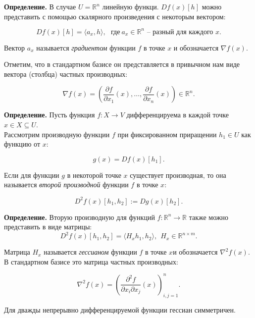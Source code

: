 \textbf{Определение.} В случае $U = \mathbb{R}^n$ линейную функци. $Df(x)[h]$ можно представить с помощью скалярного произведения с некоторым вектором:

$$Df(x)[h] = \langle a_x, h\rangle,\ \ \ \text{где}\ a_x\in\mathbb{R}^n\text{ -- разный для каждого } x. $$

Вектор $a_x$ называется \textit{градиентом}  функции $f$ в точке $x$ и обозначается $\nabla f(x)$.

Отметим, что в стандартном базисе он представляется в привычном нам виде вектора (столбца) частных производных:

$$\nabla f(x) = \left(\dfrac{\partial f}{\partial x_1}(x),\ldots,\dfrac{\partial f}{\partial x_n}(x)\right)\in \mathbb{R}^n.$$
\bigskip

\textbf{Определение.} Пусть функция $f: X \to V$ дифференцируема в каждой точке $x\in X \subseteq U$. \\
Рассмотрим производную функции $f$ при фиксированном приращении $h_1\in U$ как функцию от $x$:

$$g(x) = Df(x)[h_1].$$

Если для функции $g$ в некоторой точке $x$ существует производная, то она называется \textit{второй производной} функции $f$ в точке $x$:

$$D^2 f(x) [h_1, h_2] := Dg(x)[h_2].$$
\bigskip

\textbf{Определение.} Вторую производную для функций $f :  \mathbb{R}^n\to\mathbb{R}$ также можно представить в виде матрицы:
$$D^2f(x)[h_1, h_2] = \langle H_xh_1, h_2\rangle,\ \ H_x\in\mathbb{R}^{n\times m}.$$

Матрица $H_x$ называется \textit{гессианом} функции $f$ в точке $x$и обозначается $\nabla^2f(x).$ В стандартном базисе это матрица частных производных:

$$\nabla^2f(x) = \left(\dfrac{\partial^2 f}{\partial x_i\partial x_j}(x)\right)_{i,j = 1}^n.$$

Для дважды непрерывно дифференцируемой функции гессиан симметричен.